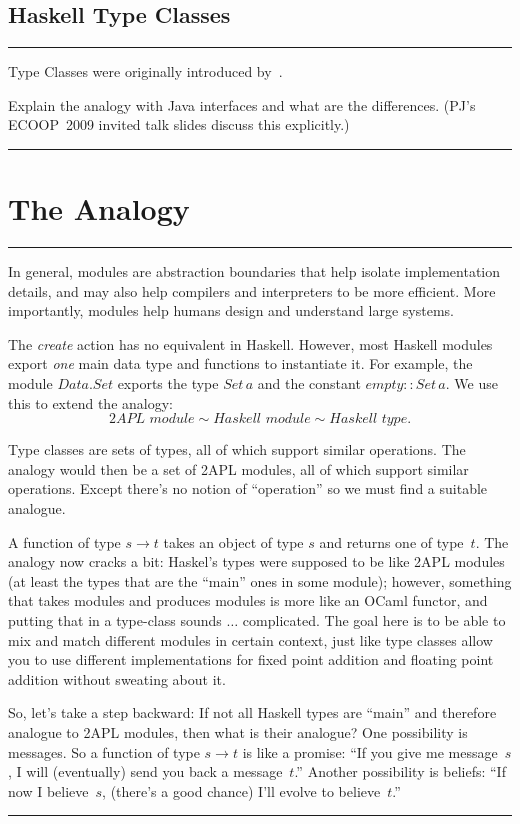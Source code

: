 \documentclass[conference,compsoc]{IEEEtran}
\newenvironment{notes}{\medskip\hrule\nobreak\smallskip\narrower}{\smallskip\hrule\medskip}
\begin{document}
\subsection{Haskell Type Classes}

\begin{notes}
Type Classes were originally introduced by~\cite{DBLP:conf/popl/WadlerB89}.

Explain the analogy with Java interfaces and what are the differences.
(PJ's ECOOP~2009 invited talk slides discuss this explicitly.)
\end{notes}

\section{The Analogy}

\begin{notes}
In general, modules are abstraction boundaries that help isolate
implementation details, and may also help compilers and interpreters to be
more efficient.  More importantly, modules help humans design and
understand large systems.

The \textit{create} action has no equivalent in Haskell. However, most
Haskell modules export \emph{one} main data type and functions to
instantiate it.  For example, the module $\mathit{Data}.\mathit{Set}$
exports the type $\mathit{Set}\,a$ and the constant
$\mathit{empty}::\mathit{Set}\,a$. We use this to extend the analogy: \[
\textit{2APL module} \sim \textit{Haskell module} \sim \textit{Haskell
type}. \]

Type classes are sets of types, all of which support similar operations.
The analogy would then be a set of 2APL modules, all of which support
similar operations. Except there's no notion of ``operation'' so we must
find a suitable analogue.

A function of type $s\to t$ takes an object of type $s$ and returns one
of type~$t$. The analogy now cracks a bit: Haskel's types were supposed
to be like 2APL modules (at least the types that are the ``main'' ones
in some module); however, something that takes modules and produces modules
is more like an OCaml functor, and putting that in a type-class sounds
$\ldots$ complicated. The goal here is to be able to mix and match different
modules in certain context, just like type classes allow you to use different
implementations for fixed point addition and floating point addition without
sweating about it.

So, let's take a step backward: If not all Haskell types are ``main'' and
therefore analogue to 2APL modules, then what is their analogue? One
possibility is messages. So a function of type $s\to t$ is like a promise:
``If you give me message~$s$, I will (eventually) send you back a
message~$t$.'' Another possibility is beliefs: ``If now I believe~$s$,
(there's a good chance) I'll evolve to believe~$t$.''

\end{notes}
\end{document}
